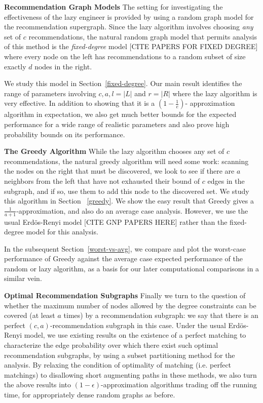 {\bf Recommendation Graph Models} The setting for investigating the
effectiveness of the lazy engineer is provided by using a random graph
model for the recommendation supergraph. Since the lazy algorithm
involves choosing {\em any} set of $c$ recommendations, the natural
random graph model that permits analysis of this method is the {\em
  fixed-degree} model [CITE PAPERS FOR FIXED DEGREE] where every node
on the left has recommendations to a random subset of size exactly $d$
nodes in the right.

We study this model in Section~\ref{fixed-degree}. Our main result identifies
the range of parameters involving $c,a,l=|L|$ and $r =|R|$ where the lazy
algorithm is very effective. In addition to showing that it is a $(1-\frac1e)$-
approximation algorithm in expectation, we also get much better bounds for the
expected performance for a wide range of realistic parameters and also prove
high probability bounds on its performance. \vs

{\bf The Greedy Algorithm}
While the lazy algorithm chooses any set of $c$ recommendations, the natural
greedy algorithm will need some work: scanning the nodes on the right that must
be discovered, we look to see if there are $a$ neighbors from the left that have
not exhausted their bound of $c$ edges in the subgraph, and if so, use them to
add this node to the discovered set. We study this algorithm in Section
~\ref{greedy}. We show the easy result that Greedy gives a 
$\frac{1}{a+1}$-approximation, and also do an average case analysis. However, we
use the usual Erd\"os-Renyi model [CITE GNP PAPERS HERE] rather than the fixed-degree model for this
analysis.

In the subsequent Section~\ref{worst-vs-avg}, we compare and plot the worst-case
performance of Greedy against the average case expected performance of the random
or lazy algorithm, as a basis for our later computational comparisons in a
similar vein. \vs

{\bf Optimal Recommendation Subgraphs}
Finally we turn to the question of whether the maximum number of nodes allowed
by the degree constraints can be covered (at least $a$ times) by a recommendation
subgraph: we say that there is an perfect $(c,a)$-recommendation subgraph in this
case. Under the usual Erd\"os-Renyi model, we use existing results on the
existence of a perfect matching to characterize the edge probability over which
there exist such optimal recommendation subgraphs, by using a subset partitioning
method for the analysis. By relaxing the condition of optimality of matching (i.e.
perfect matchings) to disallowing short augmenting paths in these methods, we also
turn the above results into $(1-\epsilon)$-approximation algorithms trading off
the running time, for appropriately dense random graphs as before. \vs

